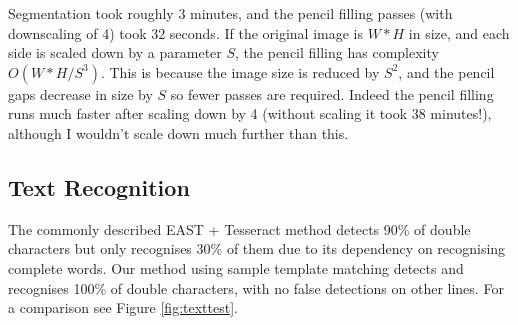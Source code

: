 \documentclass[11pt]{IEEEtran}
\begin{document}
Segmentation took roughly 3 minutes, and the pencil filling passes (with downscaling of 4) took 32 seconds. If the original image is $W*H$ in size, and each side is scaled down by a parameter $S$, the pencil filling has complexity $O({W*H}/{S^3})$. This is because the image size is reduced by $S^2$, and the pencil gaps decrease in size by $S$ so fewer passes are required. Indeed the pencil filling runs much faster after scaling down by 4 (without scaling it took 38 minutes!), although I wouldn't scale down much further than this.

\subsection{Text Recognition}

The commonly described EAST + Tesseract method detects 90\% of double characters but only recognises 30\% of them due to its dependency on recognising complete words. Our method using sample template matching detects and recognises 100\% of double characters, with no false detections on other lines. For a comparison see Figure \ref{fig:texttest}.
\end{document}
